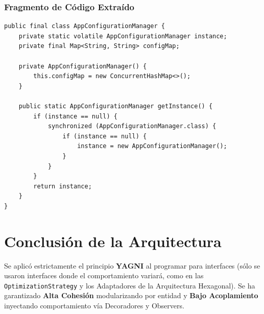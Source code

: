 \documentclass[11pt,a4paper]{article}
\begin{document}
\subsubsection*{Fragmento de Código Extraído}
\begin{lstlisting}[caption={AppConfigurationManager.java (Thread-Safe)}]
public final class AppConfigurationManager {
    private static volatile AppConfigurationManager instance;
    private final Map<String, String> configMap;

    private AppConfigurationManager() {
        this.configMap = new ConcurrentHashMap<>();
    }

    public static AppConfigurationManager getInstance() {
        if (instance == null) {
            synchronized (AppConfigurationManager.class) {
                if (instance == null) {
                    instance = new AppConfigurationManager();
                }
            }
        }
        return instance;
    }
}
\end{lstlisting}


\section{Conclusión de la Arquitectura}
Se aplicó estrictamente el principio \textbf{YAGNI} al programar para interfaces (sólo se usaron interfaces donde el comportamiento variará, como en las \texttt{OptimizationStrategy} y los Adaptadores de la Arquitectura Hexagonal). Se ha garantizado \textbf{Alta Cohesión} modularizando por entidad y \textbf{Bajo Acoplamiento} inyectando comportamiento vía Decoradores y Observers.
\end{document}
